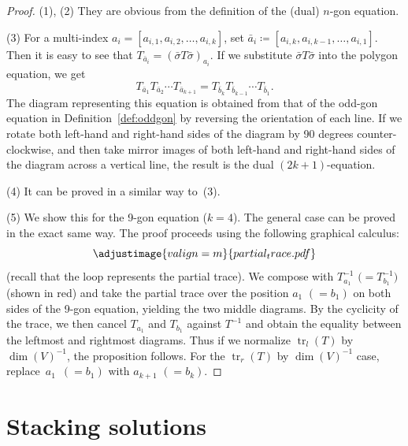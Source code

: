 \documentclass[pdftex]{sigma}
\numberwithin{equation}{section}
\theoremstyle{definition}
\begin{document}
\begin{proof}
 (1), (2) They are obvious from the definition of the (dual) $n$-gon equation.

 (3) For a multi-index $a_i=[a_{i,1},a_{i,2},\dots, a_{i,k}]$, set $\bar{a}_i\coloneqq [a_{i,k},a_{i,k-1},\dots, a_{i,1}]$.
 Then it is easy to see that $T_{\bar{a}_i}=(\bar{\sigma}T\bar{\sigma})_{a_{i}}$.
 If we substitute $\bar{\sigma}T\bar{\sigma}$ into the polygon equation, we get
 \begin{equation*}
 T_{\bar{a}_1}T_{\bar{a}_2}\cdots T_{\bar{a}_{k+1}} = T_{\bar{b}_{k}}T_{\bar{b}_{k-1}}\cdots T_{\bar{b}_1}.
 \end{equation*}
 The diagram representing this equation is obtained from that of the odd-gon equation in Definition~\ref{def:oddgon} by reversing the orientation of each line.
 If we rotate both left-hand and right-hand sides of the diagram by 90 degrees counter-clockwise, and then take mirror images of both left-hand and right-hand sides of the diagram across a vertical line, the result is the dual $(2k+1)$-equation.

 (4) It can be proved in a similar way to~(3).

 (5) We show this for the 9-gon equation ($k=4$). The general case can be proved in the exact same way. The proof proceeds using the following graphical calculus:
 \begin{equation*}
 \adjustimage{valign=m}{partial_trace.pdf}
 \end{equation*}
 (recall that the loop represents the partial trace). We compose with $T_{a_1}^{-1}$ $\bigl(=T_{b_1}^{-1}\bigr)$ (shown in red) and take the partial trace over the position $a_1$ $(=b_1)$ on both sides of the 9-gon equation, yielding the two middle diagrams. By the cyclicity of the trace, we then cancel $T_{a_1}$ and $T_{b_1}$ against $T^{-1}$ and obtain the equality between the leftmost and rightmost diagrams. Thus if we normalize $\operatorname{tr}_l(T)$ by $\dim(V)^{-1}$, the proposition follows. For the $\operatorname{tr}_r(T)$ by $\dim(V)^{-1}$ case, replace~$a_1$~$(=b_1)$ with $a_{k+1}$ $(=b_k)$.
\end{proof}

\section{Stacking solutions}\label{sec:stacking_solutions}
\end{document}
